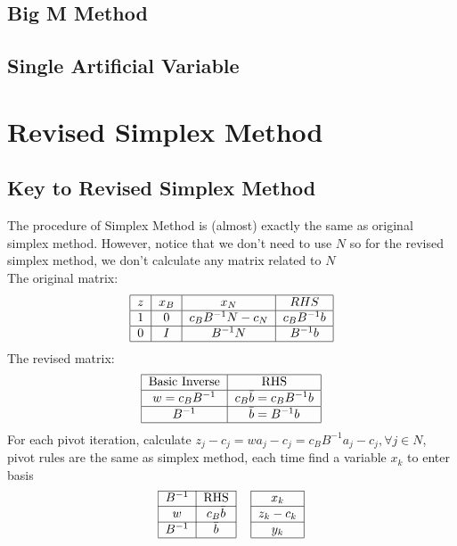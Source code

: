 			\subsection{Big M Method}

			\subsection{Single Artificial Variable}

		\section{Revised Simplex Method}
			\subsection{Key to Revised Simplex Method}
				The procedure of Simplex Method is (almost) exactly the same as original simplex method. However, notice that we don't need to use $N$ so for the revised simplex method, we don't calculate any matrix related to $N$\\
				The original matrix:
				\begin{align}
					\begin{tabular} {|c|c|c|c|}
						\hline
						$z$ & $x_B$ & $x_N$ & $RHS$ \\
						\hline
						1 & 0 & $c_BB^{-1}N - c_N$ & $c_BB^{-1}b$ \\
						\hline
						0 & $I$ & $B^{-1}N$ & $B^{-1}b$ \\
						\hline
					\end{tabular} 		
				\end{align}
				The revised matrix:
				\begin{align}
					\begin{tabular} {|c|c|}
						\hline
						Basic Inverse & RHS \\
						\hline
						$w=c_BB^{-1}$ & $c_B\bar{b} = c_BB^{-1}b$\\
						\hline
						$B^{-1}$ & $\bar{b} = B^{-1}b$\\
						\hline
					\end{tabular} 
				\end{align}
				For each pivot iteration, calculate $z_j - c_j = wa_j - c_j = c_BB^{-1}a_j - c_j, \forall j\in N$, pivot rules are the same as simplex method, each time find a variable $x_k$ to enter basis
				\begin{align}
					\begin{tabular}{|c|c|c|c|}
						\cline{1-2} \cline{4-4} $B^{-1}$ & RHS & & $x_k$ \\
						\cline{1-2} \cline{4-4} $w$ & $c_B\bar{b}$ & & $z_k-c_k$ \\
						\cline{1-2} \cline{4-4} $B^{-1}$ & $\bar{b}$ & & $y_k$ \\
						\cline{1-2} \cline{4-4}
					\end{tabular} 
				\end{align}
